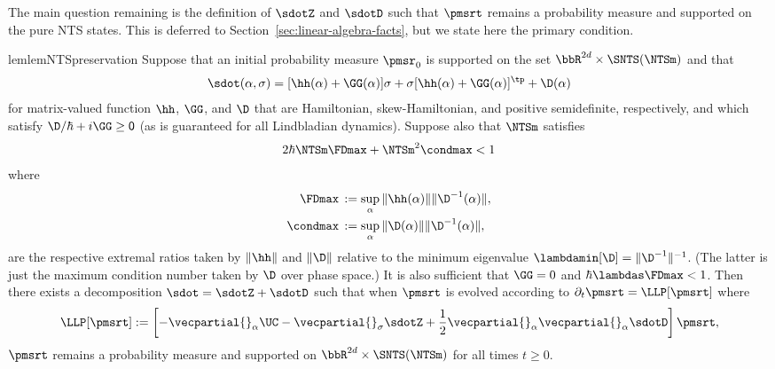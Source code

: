 \documentclass{article}
\numberwithin{equation}{section}
\begin{document}
The main question remaining is the definition of $\sdotZ$ and $\sdotD$ such that $\pmsrt$ remains a probability measure and supported on the pure NTS states.
This is deferred to Section~\ref{sec:linear-algebra-facts}, but we state here the primary condition.

\begin{restatable}{lem}{lemNTSpreservation}
    \label{lem:NTS-preserve}
    Suppose that an initial probability measure $\pmsr_0$ is supported on the set 
    $\bbR^{2d} \times\SNTS(\NTSm)$
    and that 
    \begin{align}\label{eq:nts-preserve-sdot-a-s}
        \sdot(\alpha,\sigma) = [\hh(\alpha)+\GG(\alpha)]\sigma + \sigma[\hh(\alpha)+\GG(\alpha)]^\tp + \D(\alpha)
    \end{align}
    for matrix-valued function $\hh$, $\GG$, and $\D$ that are Hamiltonian, skew-Hamiltonian, and positive semidefinite, respectively, and which satisfy $\D/\hbar + i \GG \sf \ge 0$ (as is guaranteed for all Lindbladian dynamics). Suppose also that $\NTSm$ satisfies
    \begin{align}\label{eq:nts-preserve-cond}
        2 \hbar \NTSm \FDmax +  \NTSm^2 \condmax < 1
    \end{align}
    where
    \begin{align}
        \FDmax \, & :=  
        \sup_\alpha \|\hh(\alpha)\| \|\D^{-1}(\alpha)\|,\\
        \condmax \, & := \sup_\alpha \|\D(\alpha)\| \|\D^{-1}(\alpha)\| ,
    \end{align}
    are the respective extremal ratios taken by 
    $\|\hh\|$ and $\|\D\|$ relative to the minimum eigenvalue $\lambdamin[\D] = \|\D^{-1}\|^{-1}$.  (The latter is just the maximum condition number taken by $\D$ over phase space.) It is also sufficient that $\GG = 0$ and $\hbar \lambdas \FDmax < 1$.
    Then there exists a decomposition $\sdot = \sdotZ + \sdotD$ such that when $\pmsrt$ is evolved according to $\partial_t \pmsrt = \LLP[\pmsrt]$ where
    \begin{align}
    \label{eq:llpas-def}
        \LLP[\pmsrt] := \left[-\vecpartial{}_\alpha \UC 
        -\vecpartial{}_\sigma \sdotZ 
        + \frac{1}{2} \vecpartial{}_\alpha\vecpartial{}_\alpha \sdotD\right] \pmsrt,
    \end{align}
    $\pmsrt$ remains a probability measure and supported on $\bbR^{2d} \times\SNTS(\NTSm)$ for all times $t\geq 0$.
\end{restatable}
\end{document}
